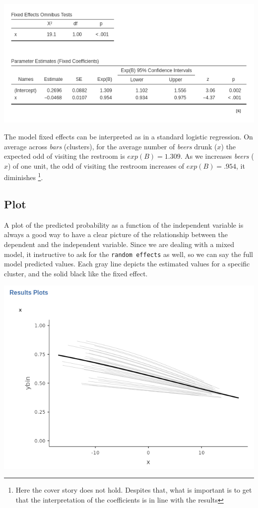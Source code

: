 \documentclass[
]{book}
\begin{document}
\includegraphics[width=0.8\linewidth]{bookletpics/5_logistic_output4}

The model fixed effects can be interpreted as in a standard logistic regression. On average across \emph{bars} (clusters), for the average number of \emph{beers} drunk (\(x\)) the expected odd of visiting the restroom is \(exp(B)=1.309\). As we increases \emph{beers} (\(x\)) of one unit, the odd of visiting the restroom increases of \(exp(B)=.954\), it diminishes \footnote{Here the cover story does not hold. Despites that, what is important is to get that the interpretation of the coefficients is in line with the results}.

\hypertarget{plot-2}{%
\subsection{Plot}\label{plot-2}}

A plot of the predicted probability as a function of the independent variable is always a good way to have a clear picture of the relationship between the dependent and the independent variable. Since we are dealing with a mixed model, it instructive to ask for the \texttt{random\ effects} as well, so we can say the full model predicted values. Each gray line depicts the estimated values for a specific cluster, and the solid black like the fixed effect.

\includegraphics[width=0.8\linewidth]{bookletpics/5_logistic_plot1}
\end{document}
